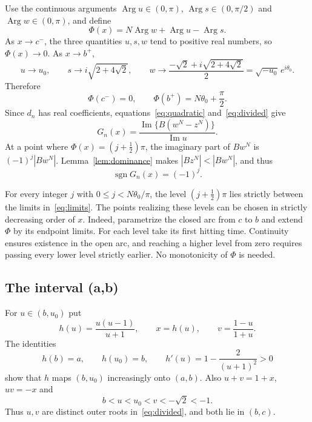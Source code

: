 \documentclass[11pt]{article}
\DeclareMathOperator{\sgn}{sgn}
\DeclareMathOperator{\Arg}{Arg}
\begin{document}
Use the continuous arguments $\Arg u\in(0,\pi)$,
$\Arg s\in(0,\pi/2)$ and $\Arg w\in(0,\pi)$, and define
\[
 \Phi(x)=N\Arg w+\Arg u-\Arg s.
\]
As $x\to c^-$, the three quantities $u,s,w$ tend to positive real
numbers, so $\Phi(x)\to0$. As $x\to b^+$,
\[
 u\to u_0,\qquad s\to i\sqrt{2+4\sqrt2},\qquad
 w\to\frac{-\sqrt2+i\sqrt{2+4\sqrt2}}2
       =\sqrt{-u_0}\,e^{i\theta_0}.
\]
Therefore
\begin{equation}\label{eq:limits}
 \Phi(c^-)=0,\qquad \Phi(b^+)=N\theta_0+\frac\pi2.
\end{equation}
Since $d_n$ has real coefficients, equations~\eqref{eq:quadratic}
and~\eqref{eq:divided} give
\begin{equation}\label{eq:phase}
 G_n(x)=\frac{\operatorname{Im}\{B(w^N-z^N)\}}{\operatorname{Im}u}.
\end{equation}
At a point where $\Phi(x)=(j+\tfrac12)\pi$, the imaginary part of
$Bw^N$ is $(-1)^j|Bw^N|$. Lemma~\ref{lem:dominance} makes
$|Bz^N|<|Bw^N|$, and thus
\begin{equation}\label{eq:sign}
 \sgn G_n(x)=(-1)^j.
\end{equation}

For every integer $j$ with $0\leq j<N\theta_0/\pi$, the level
$(j+\tfrac12)\pi$ lies strictly between the limits in~\eqref{eq:limits}.
The points realizing these levels can be chosen in strictly decreasing
order of $x$. Indeed, parametrize the closed arc from $c$ to $b$ and
extend $\Phi$ by its endpoint limits. For each level take its first hitting
time. Continuity ensures existence in the open arc, and reaching a higher
level from zero requires passing every lower level strictly earlier.
No monotonicity of $\Phi$ is needed.

\subsection{The interval (a,b)}

For $u\in(b,u_0)$ put
\[
 h(u)=\frac{u(u-1)}{u+1},\qquad x=h(u),\qquad v=\frac{1-u}{1+u}.
\]
The identities
\[
 h(b)=a,\qquad h(u_0)=b,\qquad h'(u)=1-\frac{2}{(u+1)^2}>0
\]
show that $h$ maps $(b,u_0)$ increasingly onto $(a,b)$. Also
$u+v=1+x$, $uv=-x$ and
\begin{equation}\label{eq:ordering}
 b<u<u_0<v<-\sqrt2<-1.
\end{equation}
Thus $u,v$ are distinct outer roots in~\eqref{eq:divided}, and both lie
in $(b,c)$.
\end{document}
